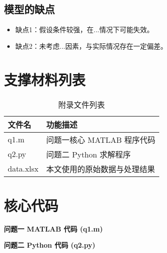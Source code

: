 \documentclass[withoutpreface,notoc]{cumcmthesis}
\begin{document}
	\subsection{模型的缺点}
	\begin{itemize}[itemindent=2em]
		\item 缺点1：假设条件较强，在...情况下可能失效。
		\item 缺点2：未考虑...因素，与实际情况存在一定偏差。
	\end{itemize}
	
	
	\newpage
	\begin{appendices}
		\section{支撑材料列表}
		\begin{table}[H]
			\centering
			\caption{附录文件列表}
			\label{tab:文件列表}
			\begin{tabularx}{\textwidth}{LL}
				\toprule
				文件名 & 功能描述 \\
				\midrule
				q1.m & 问题一核心 MATLAB 程序代码 \\
				q2.py & 问题二 Python 求解程序 \\
				data.xlsx & 本文使用的原始数据与处理结果 \\
				\bottomrule
			\end{tabularx}
		\end{table}
		
		\section{核心代码}
		\noindent\textbf{问题一 MATLAB 代码 (q1.m)}
		
		
		\noindent\textbf{问题二 Python 代码 (q2.py)}
		
		
	\end{appendices}
	
\end{document}
